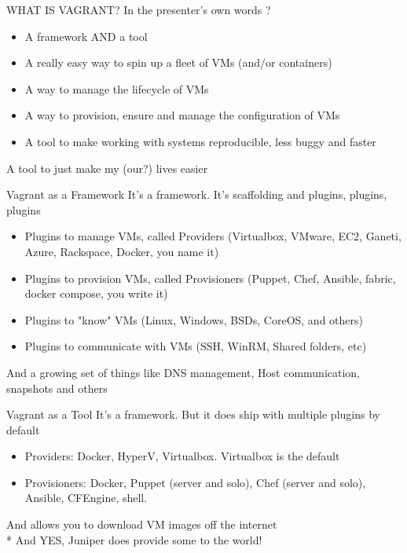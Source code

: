 \documentclass[aspectratio=1610]{beamer}
\begin{document}
    \begin{frame}{WHAT IS VAGRANT?}
        In the presenter's own words ?
        \begin{itemize}
        \pause \item A framework AND a tool
        \pause \item A really easy way to spin up a fleet of VMs (and/or containers)
        \pause \item A way to manage the lifecycle of VMs
        \pause \item A way to provision, ensure and manage the configuration of VMs
        \pause \item A tool to make working with systems reproducible, less buggy and faster
        \end{itemize}
    A tool to just make my (our?) lives easier
    \end{frame}

    \begin{frame}{Vagrant as a Framework}
        It's a framework. It's scaffolding and plugins, plugins, plugins
        \begin{itemize}
        \pause \item Plugins to manage VMs, called Providers (Virtualbox, VMware, EC2, Ganeti, Azure, Rackspace, Docker, you name it)
        \pause \item Plugins to provision VMs, called Provisioners (Puppet, Chef, Ansible, fabric, docker compose, you write it)
        \pause \item Plugins to "know" VMs (Linux, Windows, BSDs, CoreOS, and others)
        \pause \item Plugins to communicate with VMs (SSH, WinRM, Shared folders, etc)
        \end{itemize}
    And a growing set of things like DNS management, Host communication, snapshots and others
    \end{frame}

    \begin{frame}{Vagrant as a Tool}
        It's a framework. But it does ship with multiple plugins by default
        \begin{itemize}
        \pause \item Providers: Docker, HyperV, Virtualbox. Virtualbox is the default
        \pause \item Provisioners: Docker, Puppet (server and solo), Chef (server and solo), Ansible, CFEngine, shell.
        \end{itemize}
    \pause And allows you to download VM images off the internet
    \pause \\* And YES, Juniper does provide some to the world!
    \end{frame}
\end{document}
